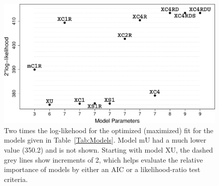 \documentclass[11pt, titlepage]{article}\usepackage[]{graphicx}\usepackage[]{color}
\begin{document}
\begin{spacing}{1.9}
\begin{flushleft}
\begin{figure}[H]
  \begin{center}
  \includegraphics[width=\linewidth]{figure/Fig-ModelsM2LL-crop.pdf}
  \end{center}
  \caption{Two times the log-likehood for the optimized (maximized) fit for the models given in Table~\ref{Tab:Models}. Model mU had a much lower value (350.2) and is not shown. Starting with model XU, the dashed grey lines show increments of 2, which helps evaluate the relative importance of models by either an AIC or a likelihood-ratio test criteria. \label{Fig-ModelsM2LL}}     
\end{figure}




\end{flushleft}
\end{spacing}
\end{document}
